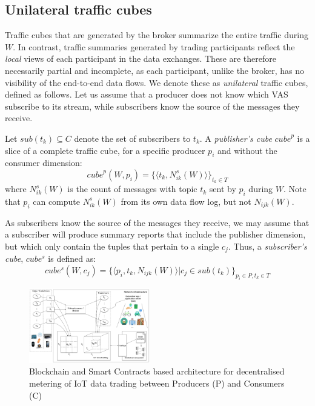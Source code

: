 \documentclass[chi_draft]{sigchi}
\begin{document}
\subsection{Unilateral traffic cubes} \label{sec:u-cubes}
Traffic cubes that are generated by the broker summarize the entire traffic during $W$.
In contrast, traffic summaries generated by trading participants reflect the \textit{local} views of each participant in the data exchanges.
These are therefore necessarily partial and incomplete, as each participant, unlike the broker, has no visibility of the end-to-end data flows. 
We denote these as \textit{unilateral} traffic cubes, defined as follows.
Let us assume that a producer does not know which VAS subscribe to its stream, while subscribers know the source of the messages they receive. 

Let $\mathit{sub}(t_k) \subseteq C $ denote the set of subscribers to $t_k$.
%
A \textit{publisher's cube} $\mathit{cube}^p$ is a slice of a complete traffic cube, for a specific producer $p_i$ and without the consumer dimension:
\[
\mathit{cube}^p(W, p_i)  =  \{ \langle t_k,  N^s_{ik}(W) \rangle \}_{t_k \in T}
\]
where $N^s_{ik}(W)$ is the count of messages with topic $t_k$ sent by $p_i$ during $W$.
Note that $ p_i $ can compute $ N^s_{ik}(W)  $ from its own data flow log, but not $ N_{ijk}(W)  $.


As subscribers know the source of the messages they receive, we may assume that a subscriber will produce summary reports that include the publisher dimension, but which only contain the tuples that pertain to a single $c_j$. Thus, a \textit{subscriber's cube}, $ \mathit{cube^s} $ is defined as:
\[
\mathit{cube^s}(W, c_j)  =  \{ \langle p_i, t_k, N_{ijk}(W) \rangle | c_j \in \mathit{sub}(t_k)\}_{p_i \in P, t_k \in T}
\]

\begin{figure}[!ht]
	\centering
	\captionsetup{justification=centering, margin=2cm}
	\includegraphics[width=0.47\textwidth]{figures/IoT-tracking-arch-2}
	\caption{Blockchain and Smart Contracts based architecture for decentralised metering of IoT data trading between Producers (P) and Consumers (C)}
	\label{fig:iot-tracking-arch-2}
\end{figure}
\end{document}
